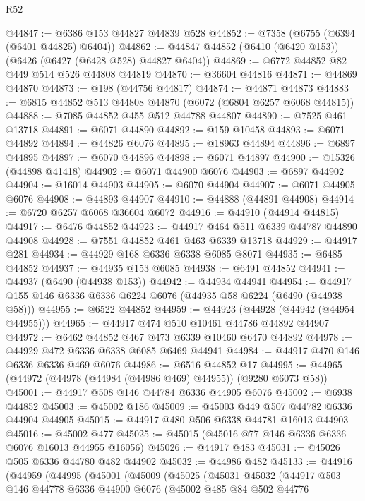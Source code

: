 \begin{lexlean}{R52}
\begin{coremodule}
@44847 := @6386 @153 @44827 @44839 @528
@44852 := @7358 (@6755 (@6394 (@6401 @44825) @6404))
@44862 := @44847 @44852 (@6410 (@6420 @153)) (@6426 (@6427 (@6428 @528) @44827 @6404))
@44869 := @6772 @44852 @82 @449 @514 @526 @44808 @44819
@44870 := @36604 @44816
@44871 := @44869 @44870
@44873 := @198 (@44756 @44817)
@44874 := @44871 @44873
@44883 := @6815 @44852 @513 @44808 @44870 (@6072 (@6804 @6257 @6068 @44815))
@44888 := @7085 @44852 @455 @512 @44788 @44807
@44890 := @7525 @461 @13718
@44891 := @6071 @44890
@44892 := @159 @10458
@44893 := @6071 @44892
@44894 := @44826 @6076
@44895 := @18963 @44894
@44896 := @6897 @44895
@44897 := @6070 @44896
@44898 := @6071 @44897
@44900 := @15326 (@44898 @41418)
@44902 := @6071 @44900 @6076
@44903 := @6897 @44902
@44904 := @16014 @44903
@44905 := @6070 @44904
@44907 := @6071 @44905 @6076
@44908 := @44893 @44907
@44910 := @44888 (@44891 @44908)
@44914 := @6720 @6257 @6068 @36604 @6072
@44916 := @44910 (@44914 @44815)
@44917 := @6476 @44852
@44923 := @44917 @464 @511 @6339 @44787 @44890 @44908
@44928 := @7551 @44852 @461 @463 @6339 @13718
@44929 := @44917 @281
@44934 := @44929 @168 @6336 @6338 @6085 @8071
@44935 := @6485 @44852
@44937 := @44935 @153 @6085
@44938 := @6491 @44852
@44941 := @44937 (@6490 (@44938 @153))
@44942 := @44934 @44941
@44954 := @44917 @155 @146 @6336 @6336 @6224 @6076 (@44935 @58 @6224 (@6490 (@44938 @58)))
@44955 := @6522 @44852
@44959 := @44923 (@44928 (@44942 (@44954 @44955)))
@44965 := @44917 @474 @510 @10461 @44786 @44892 @44907
@44972 := @6462 @44852 @467 @473 @6339 @10460 @6470 @44892
@44978 := @44929 @472 @6336 @6338 @6085 @6469 @44941
@44984 := @44917 @470 @146 @6336 @6336 @469 @6076
@44986 := @6516 @44852 @17
@44995 := @44965 (@44972 (@44978 (@44984 (@44986 @469) @44955)) (@9280 @6073 @58))
@45001 := @44917 @508 @146 @44784 @6336 @44905 @6076
@45002 := @6938 @44852
@45003 := @45002 @186
@45009 := @45003 @449 @507 @44782 @6336 @44904 @44905
@45015 := @44917 @480 @506 @6338 @44781 @16013 @44903
@45016 := @45002 @477
@45025 := @45015 (@45016 @77 @146 @6336 @6336 @6076 @16013 @44955 @16056)
@45026 := @44917 @483
@45031 := @45026 @505 @6336 @44780 @482 @44902
@45032 := @44986 @482
@45133 := @44916
    (@44959
      (@44995
        (@45001
          (@45009
            (@45025
              (@45031
                @45032
                (@44917
                  @503
                  @146
                  @44778
                  @6336
                  @44900
                  @6076
                  (@45002
                    @485
                    @84
                    @502
                    @44776

\end{coremodule}
\end{lexlean}
